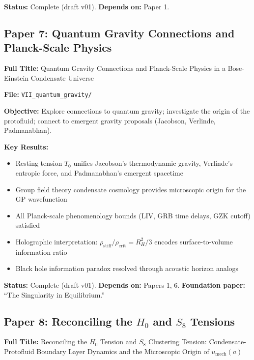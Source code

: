 \documentclass[11pt,a4paper]{article}
\newcommand{\rhostiff}{\ensuremath{\rho_{\mathrm{stiff}}}}
\newcommand{\Tzero}{\ensuremath{T_0}}
\begin{document}
\textbf{Status:} Complete (draft v01). \quad \textbf{Depends on:} Paper 1.

\subsection{Paper 7: Quantum Gravity Connections and Planck-Scale Physics}
\label{sec:paper7}

\textbf{Full Title:} Quantum Gravity Connections and Planck-Scale Physics in a Bose-Einstein Condensate Universe

\textbf{File:} \texttt{VII\_quantum\_gravity/}

\textbf{Objective:} Explore connections to quantum gravity; investigate the origin of the protofluid; connect to emergent gravity proposals (Jacobson, Verlinde, Padmanabhan).

\textbf{Key Results:}
\begin{itemize}[leftmargin=*, itemsep=0.1em]
\item Resting tension $\Tzero$ unifies Jacobson's thermodynamic gravity, Verlinde's entropic force, and Padmanabhan's emergent spacetime
\item Group field theory condensate cosmology provides microscopic origin for the GP wavefunction
\item All Planck-scale phenomenology bounds (LIV, GRB time delays, GZK cutoff) satisfied
\item Holographic interpretation: $\rhostiff/\rho_{\mathrm{crit}} = R_H^2/3$ encodes surface-to-volume information ratio
\item Black hole information paradox resolved through acoustic horizon analogs
\end{itemize}

\textbf{Status:} Complete (draft v01). \quad \textbf{Depends on:} Papers 1, 6. \quad \textbf{Foundation paper:} ``The Singularity in Equilibrium.''

\subsection{Paper 8: Reconciling the $H_0$ and $S_8$ Tensions}
\label{sec:paper8}

\textbf{Full Title:} Reconciling the $H_0$ Tension and $S_8$ Clustering Tension: Condensate-Protofluid Boundary Layer Dynamics and the Microscopic Origin of $u_{\mathrm{mech}}(a)$
\end{document}
